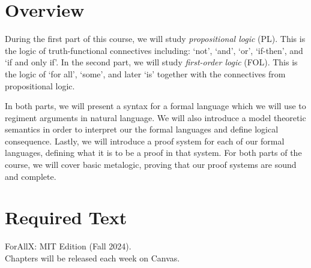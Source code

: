 \documentclass[letterpaper]{inzane_syllabus} %
\begin{document}

\makeprofile %

\section{Overview}

During the first part of this course, we will study \textit{propositional logic} (PL). 
This is the logic of truth-functional connectives including: `not', `and', `or', `if-then', and `if and only if'. 
In the second part, we will study \textit{first-order logic} (FOL). 
This is the logic of `for all', `some', and later `is' together with the connectives from propositional logic. 

In both parts, we will present a syntax for a formal language which we will use to regiment arguments in natural language.
We will also introduce a model theoretic semantics in order to interpret our the formal languages and define logical consequence. 
Lastly, we will introduce a proof system for each of our formal languages, defining what it is to be a proof in that system.
For both parts of the course, we will cover basic metalogic, proving that our proof systems are sound and complete.

\vspace{0.5cm} %
\section{Required Text}

ForAllX: MIT Edition (Fall 2024). \\
Chapters will be released each week on Canvas.

\vspace{0.5cm}
\end{document}
